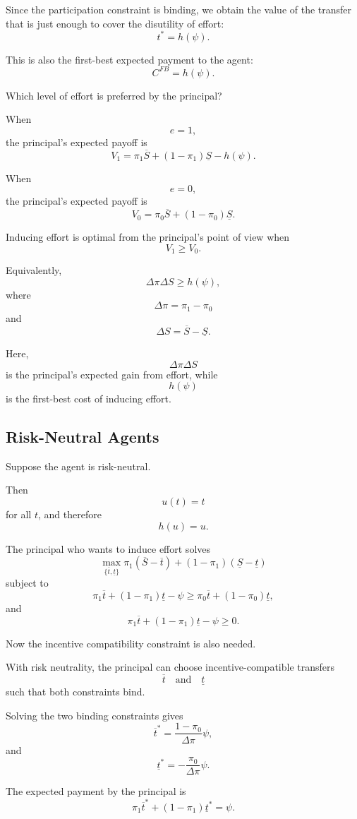 Since the participation constraint is binding, we obtain the value of the transfer that is just enough to cover the disutility of effort:
\[
t^*=h(\psi).
\]

This is also the first-best expected payment to the agent:
\[
C^{FB}=h(\psi).
\]

Which level of effort is preferred by the principal?

When
\[
e=1,
\]
the principal's expected payoff is
\[
V_1
=
\pi_1\overline S+(1-\pi_1)\underline S-h(\psi).
\]

When
\[
e=0,
\]
the principal's expected payoff is
\[
V_0
=
\pi_0\overline S+(1-\pi_0)\underline S.
\]

Inducing effort is optimal from the principal's point of view when
\[
V_1\ge V_0.
\]

Equivalently,
\[
\Delta\pi\Delta S\ge h(\psi),
\]
where
\[
\Delta\pi=\pi_1-\pi_0
\]
and
\[
\Delta S=\overline S-\underline S.
\]

Here,
\[
\Delta\pi\Delta S
\]
is the principal's expected gain from effort, while
\[
h(\psi)
\]
is the first-best cost of inducing effort.

\subsection{Risk-Neutral Agents}

Suppose the agent is risk-neutral.

Then
\[
u(t)=t
\]
for all \(t\), and therefore
\[
h(u)=u.
\]

The principal who wants to induce effort solves
\[
\max_{\{\overline t,\underline t\}}
\pi_1(\overline S-\overline t)
+
(1-\pi_1)(\underline S-\underline t)
\]
subject to
\[
\pi_1\overline t+(1-\pi_1)\underline t-\psi
\ge
\pi_0\overline t+(1-\pi_0)\underline t,
\]
and
\[
\pi_1\overline t+(1-\pi_1)\underline t-\psi
\ge 0.
\]

Now the incentive compatibility constraint is also needed.

With risk neutrality, the principal can choose incentive-compatible transfers
\[
\overline t
\quad
\text{and}
\quad
\underline t
\]
such that both constraints bind.

Solving the two binding constraints gives
\[
\overline t^*
=
\frac{1-\pi_0}{\Delta\pi}\psi,
\]
and
\[
\underline t^*
=
-\frac{\pi_0}{\Delta\pi}\psi.
\]

The expected payment by the principal is
\[
\pi_1\overline t^*
+
(1-\pi_1)\underline t^*
=
\psi.
\]

